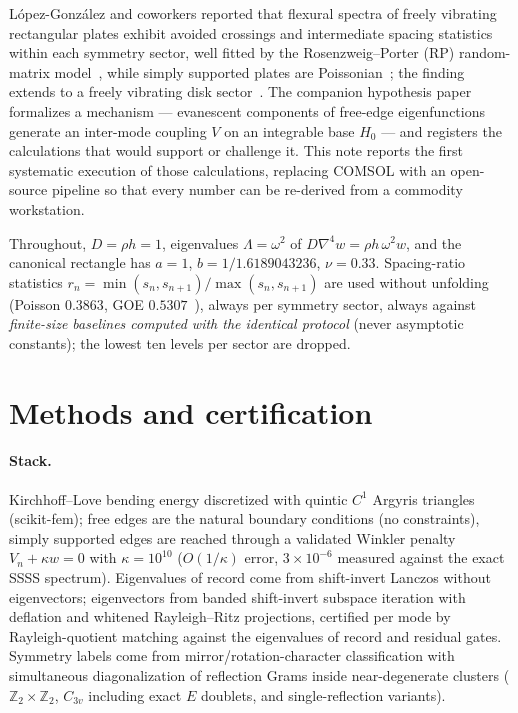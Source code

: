 \documentclass[11pt]{article}
\begin{document}
L\'opez-Gonz\'alez and coworkers reported that flexural spectra of freely
vibrating rectangular plates exhibit avoided crossings and intermediate
spacing statistics within each symmetry sector, well fitted by the
Rosenzweig--Porter (RP) random-matrix model~\cite{kravtsov2015}, while
simply supported plates are Poissonian~\cite{lopez2021}; the finding extends to a freely vibrating
disk sector~\cite{lopez2024comsol}. The companion hypothesis
paper~\cite{ornelas2026} formalizes a mechanism --- evanescent components of
free-edge eigenfunctions generate an inter-mode coupling $V$ on an
integrable base $H_0$ --- and registers the calculations that would support
or challenge it. This note reports the first systematic execution of those
calculations, replacing COMSOL with an open-source pipeline so that every
number can be re-derived from a commodity workstation.

Throughout, $D=\rho h=1$, eigenvalues $\Lambda=\omega^2$ of
$D\nabla^4 w = \rho h\,\omega^2 w$, and the canonical rectangle has $a=1$,
$b=1/1.6189043236$, $\nu=0.33$. Spacing-ratio statistics
$r_n=\min(s_n,s_{n+1})/\max(s_n,s_{n+1})$ are used without unfolding
(Poisson $0.3863$, GOE $0.5307$~\cite{atas2013}), always per symmetry
sector, always against \emph{finite-size baselines computed with the
identical protocol} (never asymptotic constants); the lowest ten levels per
sector are dropped.

\section{Methods and certification}

\paragraph{Stack.} Kirchhoff--Love bending energy discretized with quintic
$C^1$ Argyris triangles (scikit-fem); free edges are the natural boundary
conditions (no constraints), simply supported edges are reached through a
validated Winkler penalty $V_n+\kappa w=0$ with $\kappa=10^{10}$
($O(1/\kappa)$ error, $3\times10^{-6}$ measured against the exact SSSS
spectrum). Eigenvalues of record come from shift-invert Lanczos without
eigenvectors; eigenvectors from banded shift-invert subspace iteration with
deflation and whitened Rayleigh--Ritz projections, certified per mode by
Rayleigh-quotient matching against the eigenvalues of record and residual
gates. Symmetry labels come from mirror/rotation-character classification
with simultaneous diagonalization of reflection Grams inside near-degenerate
clusters ($\mathbb{Z}_2\times\mathbb{Z}_2$, $C_{3v}$ including exact $E$
doublets, and single-reflection variants).
\end{document}
